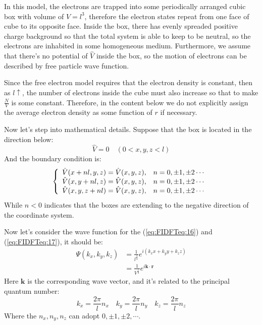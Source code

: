 In this model, the electrons are trapped into some periodically
arranged cubic box with volume of $V=l^{3}$, therefore the electron
states repeat from one face of cube to its opposite face. Inside the
box, there has evenly spreaded positive charge background so that
the total system is able to keep to be neutral, so the electrons are
inhabited in some homogeneous medium.  Furthermore, we assume that
there's no potential of $\hat{V}$ inside the box, so the motion of
electrons can be described by free particle wave function.

Since the free electron model requires that the electron density is
constant, then as $l\uparrow$, the number of electrons inside the cube
must also increase so that to make $\frac{N}{V}$ is some
constant. Therefore, in the content below we do not explicitly assign
the average electron density as some function of $r$ if necessary.

Now let's step into mathematical details. Suppose that the box is
located in the direction below:
\begin{equation}
  \label{eq:FIDFTeq:16}
\hat{V} = 0 \quad (0< x, y, z < l)
\end{equation}
And the boundary condition is:
\begin{equation}
  \label{eq:FIDFTeq:17}
 \left\{
  \begin{array}{ll}
    \hat{V}(x+nl,y,z) = \hat{V}(x,y,z), & \hbox{$n = 0, \pm 1, \pm 2 \cdots$} \\
    \hat{V}(x,y+nl,z) = \hat{V}(x,y,z), & \hbox{$n = 0, \pm 1, \pm 2 \cdots$} \\
    \hat{V}(x,y,z+nl) = \hat{V}(x,y,z), & \hbox{$n = 0, \pm 1, \pm 2 \cdots$}
  \end{array}
\right.
\end{equation}
While $n<0$ indicates that the boxes are extending to the negative
direction of the coordinate system.

Now let's consider the wave function for the (\ref{eq:FIDFTeq:16})
and (\ref{eq:FIDFTeq:17}), it should be:
\begin{align}\label{eq:FIDFTeq:18}
\Psi(k_{x}, k_{y}, k_{z}) &= \frac{1}{l^{\frac{2}{3}}}e^{i(k_{x}x+
k_{y}y+k_{z}z)} \nonumber \\
&=\frac{1}{V^{\frac{1}{2}}}e^{i \mathbf{k}\cdot \mathbf{r}}
\end{align}
Here $\mathbf{k}$ is the corresponding wave vector, and it's
related to the principal quantum number:
\begin{equation}\label{eq:FIDFTeq:19}
k_{x}=\frac{2\pi}{l}n_{x} \quad k_{y}=\frac{2\pi}{l}n_{y} \quad
k_{z}=\frac{2\pi}{l}n_{z}
\end{equation}
Where the $n_{x}, n_{y}, n_{z}$ can adopt $0, \pm 1, \pm 2, \cdots$.

